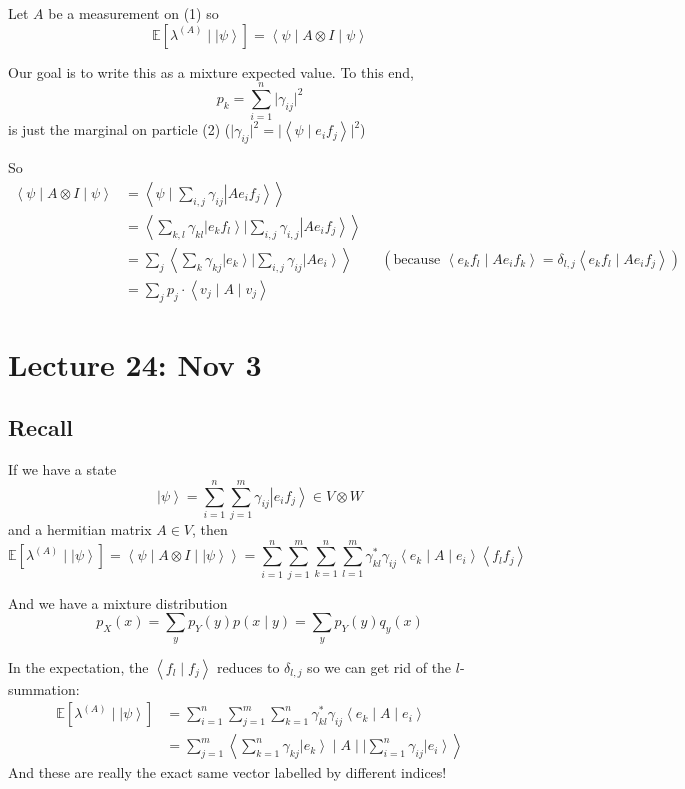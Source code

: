 \documentclass[12pt]{article}
\newcommand{\brak}[1]{\left\langle #1 \right\rangle}
\newcommand{\ket}[1]{\left\vert #1 \right\rangle}
\newcommand{\E}{\mathbb{E}}
\begin{document}
        Let $A$ be a measurement on (1) so 
        \[\E[\lambda^{(A)} \; | \; \ket \psi] = \brak{\psi \; | \; A \otimes I \; | \; \psi}\]

        Our goal is to write this as a mixture expected value. To this end, 
        \[p_k = \sum_{i=1}^n \big\vert \gamma_{ij}\big\vert^2\]
        is just the marginal on particle (2) ($\big\vert \gamma_{ij} \big\vert^2 = \big\vert\brak{\psi \; | \; e_i f_j}\big\vert^2$)

        So 
        \begin{align*}
            \brak{\psi \; | \; A \otimes I \; | \; \psi} &= \brak{\psi \; \bigg\vert \; \sum_{i, j} \gamma_{ij}\ket{Ae_i f_j} }\\
            &= \brak{\sum_{k,l} \gamma_{kl} \ket{e_k f_l} \bigg\vert \sum_{i, j} \gamma_{i, j} \ket{A e_i f_j}}\\
            &= \sum_j \brak{\sum_k \gamma_{kj} \ket{e_k} \bigg\vert \sum_{i, j} \gamma_{ij} \ket{Ae_i}} \qquad (\text{because  } \brak{e_k f_l \; | \; Ae_i f_k} = \delta_{l, j} \brak{e_k f_l \; | \; Ae_i f_j})\\
            &= \sum_{j} p_j \cdot \brak{v_j \; | \; A \; | \; v_j}
        \end{align*}

\section*{Lecture 24: Nov 3}
    \subsection*{Recall}
        If we have a state 
        \[\ket \psi = \sum_{i=1}^n \sum_{j=1}^m \gamma_{ij} \ket{e_i f_j} \in V\otimes W\]
        and a hermitian matrix $A \in V$, then 
        \[\E[\lambda^{(A)} \; | \; \ket{\psi}] = \brak{\psi \; | \; A \otimes I \; | \; \ket{\psi}} = \sum_{i=1}^n \sum_{j=1}^m \sum_{k=1}^n \sum_{l=1}^m \gamma_{kl}^* \gamma_{ij} \brak{e_k \; | \; A \; | \; e_i} \brak{f_l f_j}\]

        And we have a mixture distribution
        \[p_X(x) = \sum_y p_Y(y) p(x \; | \; y) = \sum_y p_Y(y)q_y(x)\]

        In the expectation, the $\brak{f_l \; | \; f_j}$ reduces to $\delta_{l, j}$ so we can get rid of the $l$-summation:
        \begin{align*}
            \E[\lambda^{(A)} \; | \; \ket{\psi}] &= \sum_{i=1}^n \sum_{j=1}^m \sum_{k=1}^n  \gamma_{kl}^* \gamma_{ij} \brak{e_k \; | \; A \; | \; e_i}\\
            &= \sum_{j=1}^m \brak{\sum_{k=1}^n \gamma_{kj} \ket{e_k} \; \bigg\vert \; A \; | \; \bigg\vert \sum_{i=1}^n \gamma_{ij} \ket{e_i}}
        \end{align*}
        And these are really the exact same vector labelled by different indices! 
\end{document}
